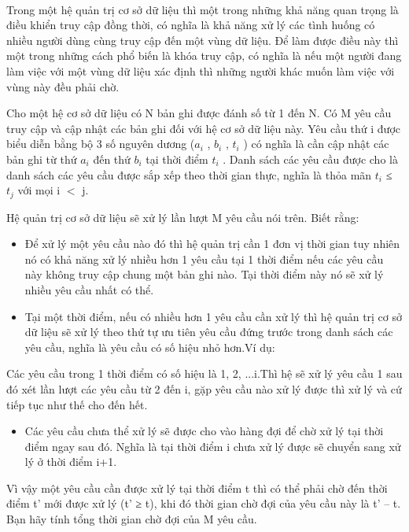 

 

Trong một hệ quản trị cơ sở dữ liệu thì một trong những khả năng quan trọng là điều khiển truy cập đồng thời, có nghĩa là khả năng xử lý các tình huống có nhiều người dùng cùng truy cập đến một vùng dữ liệu. Để làm được điều này thì một trong những cách phổ biến là khóa truy cập, có nghĩa là nếu một người đang làm việc với một vùng dữ liệu xác định thì những người khác muốn làm việc với vùng này đều phải chờ.

Cho một hệ cơ sở dữ liệu có N bản ghi được đánh số từ 1 đến N. Có M yêu cầu truy cập và cập nhật các bản ghi đối với hệ cơ sở dữ liệu này. Yêu cầu thứ i được biểu diễn bằng bộ 3 số nguyên dương ($a_{i}$ , $b_{i}$ , $t_{i}$ ) có nghĩa là cần cập nhật các bản ghi từ thứ $a_{i}$ đến thứ $b_{i}$ tại thời điểm $t_{i}$ . Danh sách các yêu cầu được cho là danh sách các yêu cầu được sắp xếp theo thời gian thực, nghĩa là thỏa mãn $t_{i}$ ≤ $t_{j}$ với mọi i $<$ j.

Hệ quản trị cơ sở dữ liệu sẽ xử lý lần lượt M yêu cầu nói trên. Biết rằng:
\begin{itemize}
	\item Để xử lý một yêu cầu nào đó thì hệ quản trị cần 1 đơn vị thời gian tuy nhiên nó có khả năng xử lý nhiều hơn 1 yêu cầu tại 1 thời điểm nếu các yêu cầu này không truy cập chung một bản ghi nào. Tại thời điểm này nó sẽ xử lý nhiều yêu cầu nhất có thể.
	\item Tại một thời điểm, nếu có nhiều hơn 1 yêu cầu cần xử lý thì hệ quản trị cơ sở dữ liệu sẽ xử lý theo thứ tự ưu tiên yêu cầu đứng trước trong danh sách các yêu cầu, nghĩa là yêu cầu có số hiệu nhỏ hơn.Ví dụ:
\end{itemize}

Các yêu cầu trong 1 thời điểm có số hiệu là 1, 2, ...i.Thì hệ sẽ xử lý yêu cầu 1 sau đó xét lần lượt các yêu cầu từ 2 đến i, gặp yêu cầu nào xử lý được thì xử lý và cứ tiếp tục như thế cho đến hết.
\begin{itemize}
	\item Các yêu cầu chưa thể xử lý sẽ được cho vào hàng đợi để chờ xử lý tại thời điểm ngay sau đó. Nghĩa là tại thời điểm i chưa xử lý được sẽ chuyển sang xử lý ở thời điểm i+1.
\end{itemize}

Vì vậy một yêu cầu cần được xử lý tại thời điểm t thì có thể phải chờ đến thời điểm t’ mới được xử lý (t’ ≥ t), khi đó thời gian chờ đợi của yêu cầu này là t’ – t. Bạn hãy tính tổng thời gian chờ đợi của M yêu cầu.

